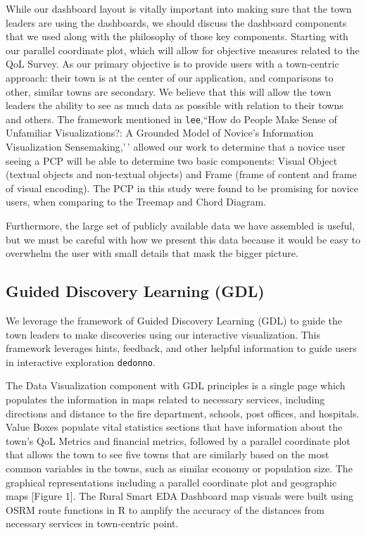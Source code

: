 \documentclass[letterpaper,inpress]{jdsart}
\begin{document}
While our dashboard layout is vitally important into making sure that the town leaders are using the dashboards, we should discuss the dashboard components that we used along with the philosophy of those key components. Starting with our parallel coordinate plot, which will allow for objective measures related to the QoL Survey. As our primary objective is to provide users with a town-centric approach: their town is at the center of our application, and comparisons to other, similar towns are secondary. We believe that this will allow the town leaders the ability to see as much data as possible with relation to their towns and others. The framework mentioned in \texttt{lee},``How do People Make Sense of Unfamiliar Visualizations?: A Grounded Model of Novice's Information Visualization Sensemaking,'\,' allowed our work to determine that a novice user seeing a PCP will be able to determine two basic components: Visual Object (textual objects and non-textual objects) and Frame (frame of content and frame of visual encoding). The PCP in this study were found to be promising for novice users, when comparing to the Treemap and Chord Diagram.

Furthermore, the large set of publicly available data we have assembled is useful, but we must be careful with how we present this data because it would be easy to overwhelm the user with small details that mask the bigger picture.

\subsection{Guided Discovery Learning (GDL)}

We leverage the framework of Guided Discovery Learning (GDL) to guide the town leaders to make discoveries using our interactive visualization. This framework leverages hints, feedback, and other helpful information to guide users in interactive exploration \texttt{dedonno}.

The Data Visualization component with GDL principles is a single page which populates the information in maps related to necessary services, including directions and distance to the fire department, schools, post offices, and hospitals. Value Boxes populate vital statistics sections that have information about the town's QoL Metrics and financial metrics, followed by a parallel coordinate plot that allows the town to see five towns that are similarly based on the most common variables in the towns, such as similar economy or population size. The graphical representations including a parallel coordinate plot and geographic maps {[}Figure 1{]}. The Rural Smart EDA Dashboard map visuals were built using OSRM route functions in R to amplify the accuracy of the distances from necessary services in town-centric point.
\end{document}
